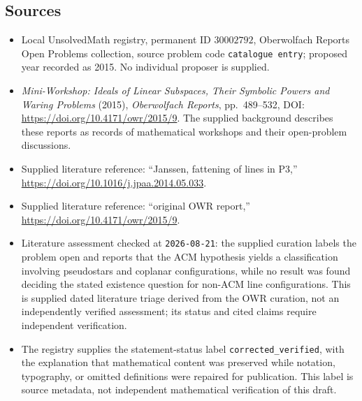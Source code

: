 \documentclass[11pt]{article}
\begin{document}
\subsection{Sources}
\begin{itemize}
\item Local UnsolvedMath registry, permanent ID \(30002792\), Oberwolfach Reports Open Problems collection, source problem code \texttt{catalogue entry}; proposed year recorded as 2015. No individual proposer is supplied.
\item \emph{Mini-Workshop: Ideals of Linear Subspaces, Their Symbolic Powers and Waring Problems} (2015), \emph{Oberwolfach Reports}, pp.\ 489--532, DOI: \url{https://doi.org/10.4171/owr/2015/9}. The supplied background describes these reports as records of mathematical workshops and their open-problem discussions.
\item Supplied literature reference: ``Janssen, fattening of lines in P3,'' \url{https://doi.org/10.1016/j.jpaa.2014.05.033}.
\item Supplied literature reference: ``original OWR report,'' \url{https://doi.org/10.4171/owr/2015/9}.
\item Literature assessment checked at \texttt{2026-08-21}: the supplied curation labels the problem open and reports that the ACM hypothesis yields a classification involving pseudostars and coplanar configurations, while no result was found deciding the stated existence question for non-ACM line configurations. This is supplied dated literature triage derived from the OWR curation, not an independently verified assessment; its status and cited claims require independent verification.
\item The registry supplies the statement-status label \texttt{corrected\_verified}, with the explanation that mathematical content was preserved while notation, typography, or omitted definitions were repaired for publication. This label is source metadata, not independent mathematical verification of this draft.
\end{itemize}
\end{document}
